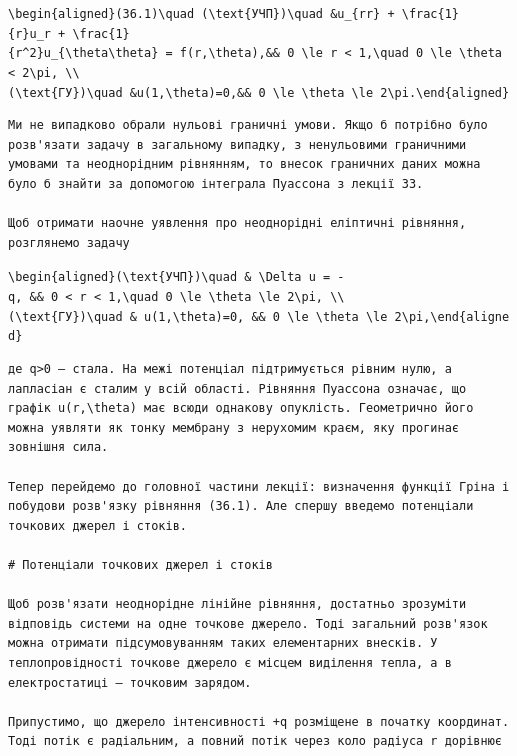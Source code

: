 \documentclass[
  ukrainian,
]{article}
\begin{document}
\texttt{\textbackslash{}begin\{aligned\}(36.1)\textbackslash{}quad\ (\textbackslash{}text\{УЧП\})\textbackslash{}quad\ \&u\_\{rr\}\ +\ \textbackslash{}frac\{1\}\{r\}u\_r\ +\ \textbackslash{}frac\{1\}\{r\^{}2\}u\_\{\textbackslash{}theta\textbackslash{}theta\}\ =\ f(r,\textbackslash{}theta),\&\&\ 0\ \textbackslash{}le\ r\ \textless{}\ 1,\textbackslash{}quad\ 0\ \textbackslash{}le\ \textbackslash{}theta\ \textless{}\ 2\textbackslash{}pi,\ \textbackslash{}\textbackslash{}(\textbackslash{}text\{ГУ\})\textbackslash{}quad\ \&u(1,\textbackslash{}theta)=0,\&\&\ 0\ \textbackslash{}le\ \textbackslash{}theta\ \textbackslash{}le\ 2\textbackslash{}pi.\textbackslash{}end\{aligned\}}

\begin{verbatim}
Ми не випадково обрали нульові граничні умови. Якщо б потрібно було розв'язати задачу в загальному випадку, з ненульовими граничними умовами та неоднорідним рівнянням, то внесок граничних даних можна було б знайти за допомогою інтеграла Пуассона з лекції 33.

Щоб отримати наочне уявлення про неоднорідні еліптичні рівняння, розглянемо задачу
\end{verbatim}

\texttt{\textbackslash{}begin\{aligned\}(\textbackslash{}text\{УЧП\})\textbackslash{}quad\ \&\ \textbackslash{}Delta\ u\ =\ -q,\ \&\&\ 0\ \textless{}\ r\ \textless{}\ 1,\textbackslash{}quad\ 0\ \textbackslash{}le\ \textbackslash{}theta\ \textbackslash{}le\ 2\textbackslash{}pi,\ \textbackslash{}\textbackslash{}(\textbackslash{}text\{ГУ\})\textbackslash{}quad\ \&\ u(1,\textbackslash{}theta)=0,\ \&\&\ 0\ \textbackslash{}le\ \textbackslash{}theta\ \textbackslash{}le\ 2\textbackslash{}pi,\textbackslash{}end\{aligned\}}

\begin{verbatim}
де q>0 — стала. На межі потенціал підтримується рівним нулю, а лапласіан є сталим у всій області. Рівняння Пуассона означає, що графік u(r,\theta) має всюди однакову опуклість. Геометрично його можна уявляти як тонку мембрану з нерухомим краєм, яку прогинає зовнішня сила.

Тепер перейдемо до головної частини лекції: визначення функції Гріна і побудови розв'язку рівняння (36.1). Але спершу введемо потенціали точкових джерел і стоків.

# Потенціали точкових джерел і стоків

Щоб розв'язати неоднорідне лінійне рівняння, достатньо зрозуміти відповідь системи на одне точкове джерело. Тоді загальний розв'язок можна отримати підсумовуванням таких елементарних внесків. У теплопровідності точкове джерело є місцем виділення тепла, а в електростатиці — точковим зарядом.

Припустимо, що джерело інтенсивності +q розміщене в початку координат. Тоді потік є радіальним, а повний потік через коло радіуса r дорівнює
\end{verbatim}
\end{document}
